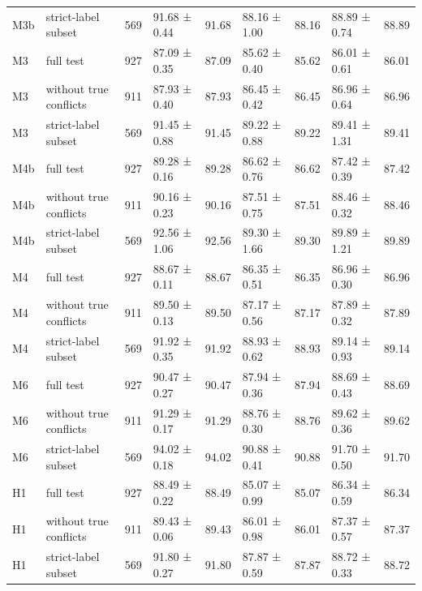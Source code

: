 \begin{tabular}{llrlrlrlr}
M3b & strict-label subset & 569 & 91.68 ± 0.44 & 91.68 & 88.16 ± 1.00 & 88.16 & 88.89 ± 0.74 & 88.89 \\
M3 & full test & 927 & 87.09 ± 0.35 & 87.09 & 85.62 ± 0.40 & 85.62 & 86.01 ± 0.61 & 86.01 \\
M3 & without true conflicts & 911 & 87.93 ± 0.40 & 87.93 & 86.45 ± 0.42 & 86.45 & 86.96 ± 0.64 & 86.96 \\
M3 & strict-label subset & 569 & 91.45 ± 0.88 & 91.45 & 89.22 ± 0.88 & 89.22 & 89.41 ± 1.31 & 89.41 \\
M4b & full test & 927 & 89.28 ± 0.16 & 89.28 & 86.62 ± 0.76 & 86.62 & 87.42 ± 0.39 & 87.42 \\
M4b & without true conflicts & 911 & 90.16 ± 0.23 & 90.16 & 87.51 ± 0.75 & 87.51 & 88.46 ± 0.32 & 88.46 \\
M4b & strict-label subset & 569 & 92.56 ± 1.06 & 92.56 & 89.30 ± 1.66 & 89.30 & 89.89 ± 1.21 & 89.89 \\
M4 & full test & 927 & 88.67 ± 0.11 & 88.67 & 86.35 ± 0.51 & 86.35 & 86.96 ± 0.30 & 86.96 \\
M4 & without true conflicts & 911 & 89.50 ± 0.13 & 89.50 & 87.17 ± 0.56 & 87.17 & 87.89 ± 0.32 & 87.89 \\
M4 & strict-label subset & 569 & 91.92 ± 0.35 & 91.92 & 88.93 ± 0.62 & 88.93 & 89.14 ± 0.93 & 89.14 \\
M6 & full test & 927 & 90.47 ± 0.27 & 90.47 & 87.94 ± 0.36 & 87.94 & 88.69 ± 0.43 & 88.69 \\
M6 & without true conflicts & 911 & 91.29 ± 0.17 & 91.29 & 88.76 ± 0.30 & 88.76 & 89.62 ± 0.36 & 89.62 \\
M6 & strict-label subset & 569 & 94.02 ± 0.18 & 94.02 & 90.88 ± 0.41 & 90.88 & 91.70 ± 0.50 & 91.70 \\
H1 & full test & 927 & 88.49 ± 0.22 & 88.49 & 85.07 ± 0.99 & 85.07 & 86.34 ± 0.59 & 86.34 \\
H1 & without true conflicts & 911 & 89.43 ± 0.06 & 89.43 & 86.01 ± 0.98 & 86.01 & 87.37 ± 0.57 & 87.37 \\
H1 & strict-label subset & 569 & 91.80 ± 0.27 & 91.80 & 87.87 ± 0.59 & 87.87 & 88.72 ± 0.33 & 88.72 \\
\bottomrule
\end{tabular}
